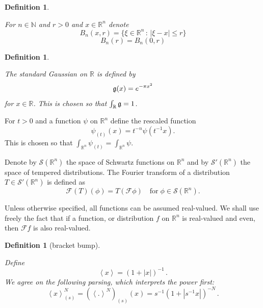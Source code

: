 \documentclass[12pt,reqno]{amsart}
\theoremstyle{plain}
\newtheorem{definition}[theorem]{Definition}
\numberwithin{equation}{section}
\theoremstyle{remark}
\newcommand{\uses}[1]{}
\newcommand{\usesdefs}[1]{}
\newcommand{\lean}[1]{}
\newcommand{\R}{{\mathbb R}}
\newcommand{\N}{{\mathbb N}}
\begin{document}
\begin{definition}\label{closed ball}\uses{}\usesdefs{}
\lean{Metric.closedBall}
    For $n\in\N$ and $r>0$ and $x\in \R^n$ denote
\begin{equation}\label{auto:closed-ball-definition} B_n(x,r) = \{ \xi\in\mathbb{R}^n\,:\, |\xi-x|\le r \} \end{equation}
\begin{equation}\label{auto:centered-closed-ball-definition} B_n(r) = B_n(0,r) \end{equation}

\end{definition}


\begin{definition}\label{gaussian}\uses{}\usesdefs{}
\lean{Auto.gaussian}
The standard Gaussian on $\R$ is defined by
\begin{equation}\label{standard Gaussian formula}
\mathfrak{g}(x)=e^{-\pi x^2}
\end{equation}
for $x\in\R$. This is chosen so that $\int_{\R}\g=1$.
\end{definition}


For $t>0$ and a function $\psi$ on $\R^n$ define the rescaled function
\begin{equation}\label{auto:L1-normalized-dilation}
\psi_{(t)}(x)=t^{-n} \psi(t^{-1}x).
\end{equation}
This is chosen so that $\int_{\R^n} \psi_{(t)} = \int_{\R^n} \psi$.

Denote by $\mathcal{S}(\R^n)$ the space of Schwartz functions on $\R^n$ and by $\mathcal{S}'(\R^n)$ the space of tempered distributions. The Fourier transform of a distribution $T\in\mathcal{S}'(\R^n)$ is defined as
\begin{equation}\label{auto:Fourier-transform-of-distribution} \mathcal{F}(T)(\phi) = T(\mathcal{F}\phi)\quad\text{for}\;\phi\in\mathcal{S}(\R^n). \end{equation}

Unless otherwise specified, all functions can be assumed real-valued.
We shall use freely the fact that if a function, or distribution $f$ on $\R^n$ is real-valued and even, then $\mathcal{F} f$ is also real-valued.


\begin{definition}[bracket bump]\label{bracket bump}\uses{}\usesdefs{}
\lean{Auto.bracketBump,Auto.scaledBracketBump,Auto.scaledBracketBumpReal}
Define
\begin{equation}\label{auto:bracket-weight-definition}
    \left<x\right>=(1+|x|)^{-1}\, .
\end{equation}
We agree on the following parsing, which interprets the power first:
\begin{equation}\label{auto:scaled-bracket-weight}
    \left<x\right>^N_{(s)}=(\left< .\right>^N)_{(s)}(x)=s^{-1}(1+|s^{-1}x|)^{-N}\, .
\end{equation}
\end{definition}
\end{document}
